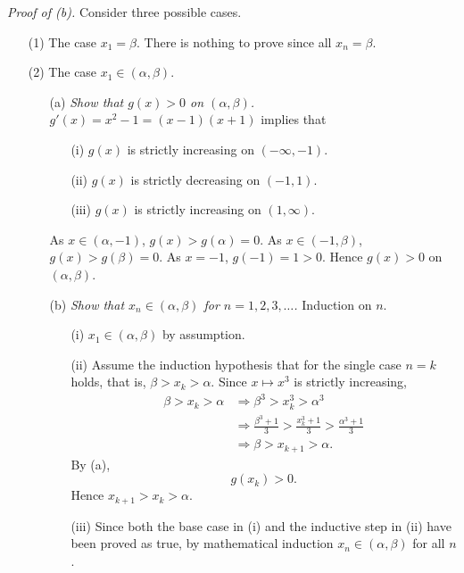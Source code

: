\documentclass{article}
\begin{document}
\emph{Proof of (b).}
Consider three possible cases.
\begin{enumerate}
\item[(1)]
The case $x_1 = \beta$.
There is nothing to prove since all $x_n = \beta$.

\item[(2)]
The case $x_1 \in (\alpha,\beta)$.
  \begin{enumerate}
  \item[(a)]
  \emph{Show that $g(x) > 0$ on $(\alpha, \beta)$.}
  $g'(x) = x^2 - 1 = (x-1)(x+1)$ implies that
    \begin{enumerate}
    \item[(i)]
    $g(x)$ is strictly increasing on $(-\infty,-1)$.

    \item[(ii)]
    $g(x)$ is strictly decreasing on $(-1,1)$.

    \item[(iii)]
    $g(x)$ is strictly increasing on $(1, \infty)$.
    \end{enumerate}
  As $x \in (\alpha,-1)$, $g(x) > g(\alpha) = 0$.
  As $x \in (-1,\beta)$, $g(x) > g(\beta) = 0$.
  As $x = -1$, $g(-1) = 1 > 0$.
  Hence $g(x) > 0$ on $(\alpha, \beta)$.

  \item[(b)]
  \emph{Show that $x_n \in (\alpha, \beta)$ for $n = 1, 2, 3, \ldots$.}
  Induction on $n$.
    \begin{enumerate}
    \item[(i)]
    $x_1 \in (\alpha, \beta)$ by assumption.

    \item[(ii)]
    Assume the induction hypothesis that for the single case $n = k$ holds,
    that is, $\beta > x_k > \alpha$.
    Since $x \mapsto x^3$ is strictly increasing,
    \begin{align*}
      \beta > x_k > \alpha
      &\Longrightarrow
      \beta^3 > x_k^3 > \alpha^3 \\
      &\Longrightarrow
      \frac{\beta^3 + 1}{3} > \frac{x_k^3+1}{3} > \frac{\alpha^3+1}{3} \\
      &\Longrightarrow
      \beta > x_{k+1} > \alpha.
    \end{align*}
    By (a),
    \[
      g(x_{k}) > 0.
    \]
    Hence $x_{k+1} > x_{k} > \alpha$.

    \item[(iii)]
    Since both the base case in (i) and
    the inductive step in (ii) have been proved as true,
    by mathematical induction $x_n \in (\alpha, \beta)$ for all $n$.
    \end{enumerate}


\end{enumerate}
\end{enumerate}
\end{document}

